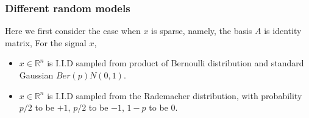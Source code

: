 \documentclass[letter, 10pt]{article}
\numberwithin{equation}{section}
\begin{document}
\subsubsection{Different random models}
Here we first consider the case when $x$ is sparse, namely, the basis $A$ is identity matrix, For the signal $x$,
\begin{itemize}
\item $x\in \mathbb{R}^n$ is I.I.D sampled from product of Bernoulli distribution and standard Gaussian $Ber(p)N(0,1)$.
\item $x\in \mathbb{R}^n$ is I.I.D sampled from the Rademacher distribution, with probability $p/2$ to be $+1$, $p/2$ to be $-1$, $1-p$ to be $0$.
\end{itemize}

\end{document}
